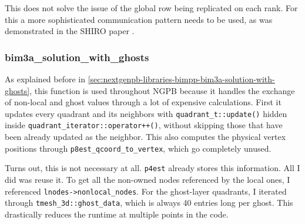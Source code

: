 This does not solve the issue of the global row being replicated on each rank.
For this a more sophisticated communication pattern needs to be used, as was demonstrated in the SHIRO paper \cite{zhuang2025shiro}.

\subsubsection{bim3a\_solution\_with\_ghosts}
\label{sec:implementation-host-side-bimpp-bim3a-solution-with-ghosts}

As explained before in \ref{sec:nextgenpb-libraries-bimpp-bim3a-solution-with-ghosts}, this function is used throughout NGPB because it handles the exchange of non-local and ghost values through a lot of expensive calculations.
First it updates every quadrant and its neighbors with \texttt{quadrant\_t::update()} hidden inside \texttt{quadrant\_iterator::operator++()}, without skipping those that have been already updated as the neighbor.
This also computes the physical vertex positions through \texttt{p8est\_qcoord\_to\_vertex}, which go completely unused.

Turns out, this is not necessary at all. 
\texttt{p4est} already stores this information.
All I did was reuse it.
To get all the non-owned nodes referenced by the local ones, I referenced \texttt{lnodes->nonlocal\_nodes}.
For the ghost-layer quadrants, I iterated through \texttt{tmesh\_3d::ghost\_data}, which is always 40 entries long per ghost.
This drastically reduces the runtime at multiple points in the code.
